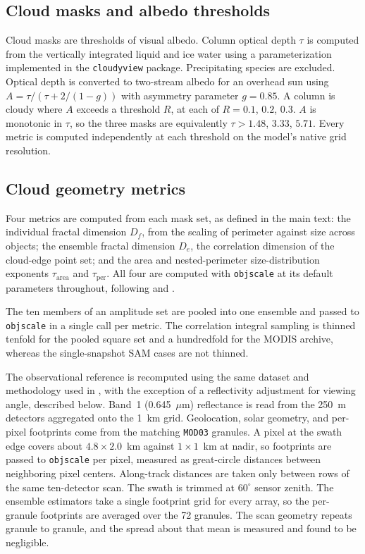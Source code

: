 \documentclass{article}
\begin{document}
\subsection{Cloud masks and albedo thresholds}
\label{ssect:albedo masks}

Cloud masks are thresholds of visual albedo. Column optical depth
$\tau$ is computed from the vertically integrated liquid and ice water
using a parameterization implemented in the
\texttt{cloudyview} package. Precipitating species are excluded. Optical depth is
converted to two-stream albedo for an
overhead sun using $A = \tau/(\tau + 2/(1-g))$ with asymmetry parameter
$g = 0.85$. A column is cloudy where $A$ exceeds a threshold $R$, at
each of $R = 0.1$, $0.2$, $0.3$. $A$ is monotonic in $\tau$,
so the three masks are equivalently $\tau > 1.48$, $3.33$, $5.71$.
Every metric is computed independently at each threshold on the model's native grid resolution.

\subsection{Cloud geometry metrics}
\label{ssect:cloud geometry}

Four metrics are computed from each mask set, as defined in the main
text: the individual fractal dimension $D_f$, from the scaling of
perimeter against size across objects; the ensemble fractal dimension
$D_e$, the correlation dimension of the cloud-edge point set; and the
area and nested-perimeter size-distribution exponents
$\tau_{\mathrm{area}}$ and $\tau_{\mathrm{per}}$. All four are
computed with \texttt{objscale} \citep{dewitt2026objscale} at its default
parameters throughout, following \citet{dewitt2024b} and \citet{dewitt2026}.

The ten members of an amplitude set are pooled into one ensemble and
passed to \texttt{objscale} in a single call per metric. 
The correlation integral sampling is thinned tenfold for the pooled
square set and a hundredfold for the MODIS archive, whereas the single-snapshot SAM cases are not
thinned. 

The observational reference is recomputed using the same dataset and methodology used in \citet{dewitt2026}, with the exception of a reflectivity adjustment for viewing angle, described below. 
Band~1 (0.645~$\mu$m) reflectance is read from the 250~m detectors
aggregated onto the 1~km grid. Geolocation, solar geometry, and
per-pixel footprints come from the matching \verb|MOD03| granules. A pixel at
the swath edge covers about $4.8\times 2.0$~km against $1\times 1$~km
at nadir, so footprints are passed to \texttt{objscale} per pixel,
measured as great-circle distances between neighboring pixel centers.
Along-track distances are taken only between rows of the same
ten-detector scan. The swath is trimmed at $60^\circ$
sensor zenith. The ensemble estimators take a single footprint grid
for every array, so the per-granule footprints are averaged over the
72 granules. The scan geometry repeats granule to granule, and the
spread about that mean is measured and found to be negligible.
\end{document}
